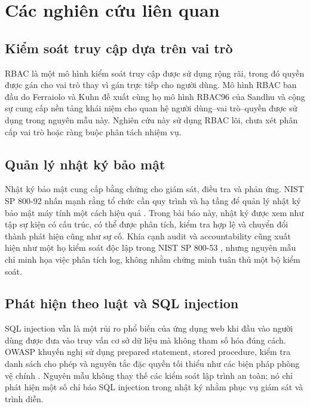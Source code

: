 \section{Các nghiên cứu liên quan}
\label{sec:related-work}

\subsection{Kiểm soát truy cập dựa trên vai trò}
\label{subsec:rbac}

RBAC là một mô hình kiểm soát truy cập được sử dụng rộng rãi, trong đó quyền
được gán cho vai trò thay vì gán trực tiếp cho người dùng. Mô hình RBAC ban đầu
do Ferraiolo và Kuhn đề xuất \citep{Ferraiolo1992RBAC} cùng họ mô hình RBAC96
của Sandhu và cộng sự \citep{Sandhu1996RBAC} cung cấp nền tảng khái niệm cho
quan hệ người dùng--vai trò--quyền được sử dụng trong nguyên mẫu này. Nghiên cứu
này sử dụng RBAC lõi, chưa xét phân cấp vai trò hoặc ràng buộc phân tách nhiệm
vụ.

\subsection{Quản lý nhật ký bảo mật}
\label{subsec:log-management}

Nhật ký bảo mật cung cấp bằng chứng cho giám sát, điều tra và phản ứng. NIST SP
800-92 nhấn mạnh rằng tổ chức cần quy trình và hạ tầng để quản lý nhật ký bảo
mật máy tính một cách hiệu quả \citep{Kent2006SP80092}. Trong bài báo này, nhật
ký được xem như tập sự kiện có cấu trúc, có thể được phân tích, kiểm tra hợp lệ
và chuyển đổi thành phát hiện cũng như sự cố. Khía cạnh audit và accountability
cũng xuất hiện như một họ kiểm soát độc lập trong NIST SP 800-53
\citep{JTF2020SP80053}, nhưng nguyên mẫu chỉ minh họa việc phân tích log, không
nhằm chứng minh tuân thủ một bộ kiểm soát.

\subsection{Phát hiện theo luật và SQL injection}
\label{subsec:rule-detection}

SQL injection vẫn là một rủi ro phổ biến của ứng dụng web khi đầu vào người dùng
được đưa vào truy vấn cơ sở dữ liệu mà không tham số hóa đúng cách. OWASP khuyến
nghị sử dụng prepared statement, stored procedure, kiểm tra danh sách cho phép
và nguyên tắc đặc quyền tối thiểu như các biện pháp phòng vệ chính
\citep{OWASPSQLi}. Nguyên mẫu không thay thế các kiểm soát lập trình an toàn;
nó chỉ phát hiện một số chỉ báo SQL injection trong nhật ký nhằm phục vụ giám
sát và trình diễn.

